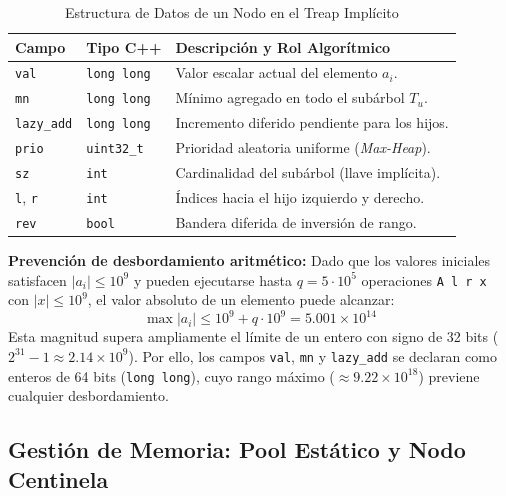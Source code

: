 \documentclass[journal,10pt,a4paper]{IEEEtran}
\begin{document}
\begin{table}[htbp]
\centering
\caption{Estructura de Datos de un Nodo en el Treap Implícito}
\label{tab:nodo}
\footnotesize
\setlength{\tabcolsep}{4pt}
\begin{tabular}{llp{4.2cm}}
\toprule
\textbf{Campo} & \textbf{Tipo C++} & \textbf{Descripción y Rol Algorítmico} \\
\midrule
\texttt{val} & \texttt{long long} & Valor escalar actual del elemento $a_i$. \\
\texttt{mn} & \texttt{long long} & Mínimo agregado en todo el subárbol $T_u$. \\
\texttt{lazy\_add} & \texttt{long long} & Incremento diferido pendiente para los hijos. \\
\texttt{prio} & \texttt{uint32\_t} & Prioridad aleatoria uniforme (\textit{Max-Heap}). \\
\texttt{sz} & \texttt{int} & Cardinalidad del subárbol (llave implícita). \\
\texttt{l}, \texttt{r} & \texttt{int} & Índices hacia el hijo izquierdo y derecho. \\
\texttt{rev} & \texttt{bool} & Bandera diferida de inversión de rango. \\
\bottomrule
\end{tabular}
\end{table}

\textbf{Prevención de desbordamiento aritmético:} Dado que los valores iniciales satisfacen $|a_i| \le 10^9$ y pueden ejecutarse hasta $q = 5 \cdot 10^5$ operaciones \texttt{A l r x} con $|x| \le 10^9$, el valor absoluto de un elemento puede alcanzar:
\begin{equation}
    \max |a_i| \le 10^9 + q \cdot 10^9 = 5.001 \times 10^{14}
\end{equation}
Esta magnitud supera ampliamente el límite de un entero con signo de 32 bits ($2^{31} - 1 \approx 2.14 \times 10^9$). Por ello, los campos \texttt{val}, \texttt{mn} y \texttt{lazy\_add} se declaran como enteros de 64 bits (\texttt{long long}), cuyo rango máximo ($\approx 9.22 \times 10^{18}$) previene cualquier desbordamiento.

\subsection{Gestión de Memoria: Pool Estático y Nodo Centinela}
\end{document}
